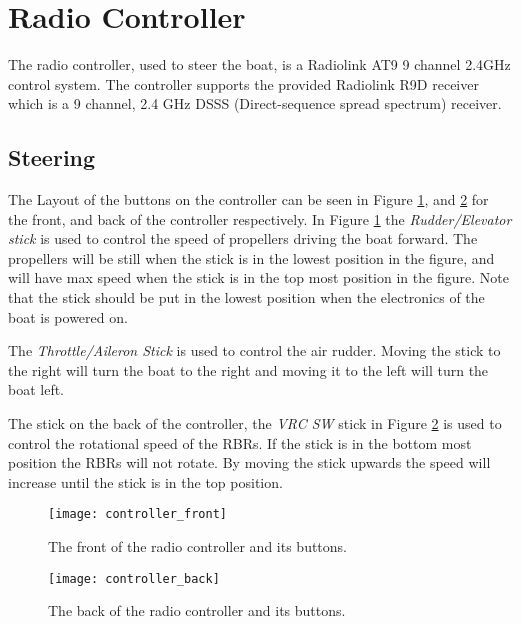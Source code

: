 \section{Radio Controller}
The radio controller, used to steer the boat, is a Radiolink AT9 9 channel 2.4GHz control system. The controller supports the provided Radiolink R9D receiver which is a 9 channel, 2.4 GHz DSSS (Direct-sequence spread spectrum) receiver.
\subsection{Steering}
The Layout of the buttons on the controller can be seen in Figure \ref{fig:controller_front}, and \ref{fig:controller_back} for the front, and back of the controller respectively. In Figure \ref{fig:controller_front} the \textit{Rudder/Elevator stick} is used to control the speed of propellers driving the boat forward. The propellers will be still when the stick is in the lowest position in the figure, and will have max speed when the stick is in the top most position in the figure. Note that the stick should be put in the lowest position when the electronics of the boat is powered on.

The \textit{Throttle/Aileron Stick} is used to control the air rudder. Moving the stick to the right will turn the boat to the right and moving it to the left will turn the boat left.

The stick on the back of the controller, the \textit{VRC SW} stick in Figure \ref{fig:controller_back} is used to control the rotational speed of the RBRs. If the stick is in the bottom most position the RBRs will not rotate. By moving the stick upwards the speed will increase until the stick is in the top position.


\begin{figure}[p]
   \centering
   \texttt{[image: controller\_front]}
   \caption{The front of the radio controller and its buttons.}
   \label{fig:controller_front}
\end{figure}

\begin{figure}[p]
   \centering
   \texttt{[image: controller\_back]}
   \caption{The back of the radio controller and its buttons.}
   \label{fig:controller_back}
\end{figure}

